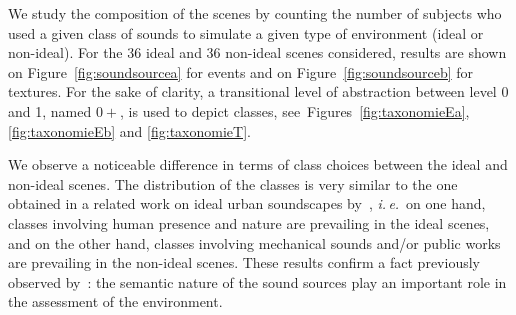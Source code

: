 \documentclass[12pt]{elsarticle}
\newcommand{\ie}{\emph{i.\,e.}}
\newcommand{\cf}{cf.}
\begin{document}

We study the composition of the scenes by counting the number of subjects who used a given class of sounds to simulate a given type of environment (ideal or non-ideal). For the 36 ideal and 36 non-ideal scenes considered, results are shown on Figure~\ref{fig:soundsourcea} for events and on Figure~\ref{fig:soundsourceb} for textures. For the sake of clarity, a transitional level of abstraction between level 0 and 1, named $0+$, is used to depict classes, see~Figures~\ref{fig:taxonomieEa}, \ref{fig:taxonomieEb} and \ref{fig:taxonomieT}.


We observe a noticeable difference in terms of class choices between the ideal and non-ideal scenes. The distribution of the classes is very similar to the one obtained in a related work on ideal urban soundscapes by~\cite{guastavino2006ideal}, \ie~on one hand, classes involving human presence and nature are prevailing in the ideal scenes, and on the other hand, classes involving mechanical sounds and/or public works are prevailing in the non-ideal scenes. These results confirm a fact previously observed by~\cite{raimbault2005urban,dubois2006cognitive}: the semantic nature of the sound sources play an important role in the assessment of the environment.

\end{document}
